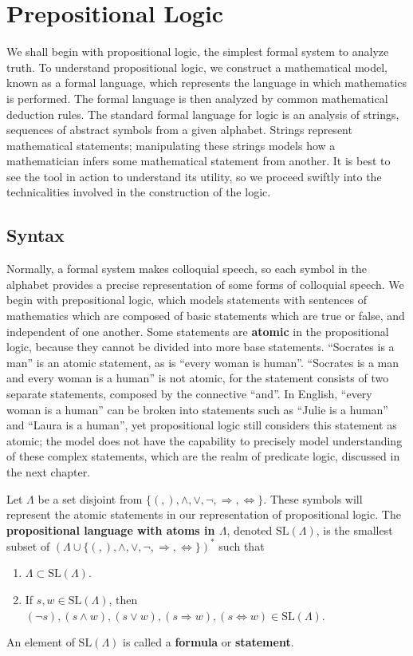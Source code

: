 \chapter{Prepositional Logic}

We shall begin with propositional logic, the simplest formal system to analyze truth. To understand propositional logic, we construct a mathematical model, known as a formal language, which represents the language in which mathematics is performed. The formal language is then analyzed by common mathematical deduction rules. The standard formal language for logic is an analysis of strings, sequences of abstract symbols from a given alphabet. Strings represent mathematical statements; manipulating these strings models how a mathematician infers some mathematical statement from another. It is best to see the tool in action to understand its utility, so we proceed swiftly into the technicalities involved in the construction of the logic.

\section{Syntax}

Normally, a formal system makes colloquial speech, so each symbol in the alphabet provides a precise representation of some forms of colloquial speech. We begin with prepositional logic, which models statements with sentences of mathematics which are composed of basic statements which are true or false, and independent of one another. Some statements are {\bf atomic} in the propositional logic, because they cannot be divided into more base statements. ``Socrates is a man'' is an atomic statement, as is ``every woman is human''. ``Socrates is a man and every woman is a human'' is not atomic, for the statement consists of two separate statements, composed by the connective ``and''. In English, ``every woman is a human'' can be broken into statements such as ``Julie is a human'' and ``Laura is a human'', yet propositional logic still considers this statement as atomic; the model does not have the capability to precisely model understanding of these complex statements, which are the realm of predicate logic, discussed in the next chapter.

Let $\Lambda$ be a set disjoint from $\{ (, ), \wedge, \vee, \neg, \Rightarrow, \Leftrightarrow \}$. These symbols will represent the atomic statements in our representation of propositional logic. The {\bf propositional language with atoms in $\Lambda$}, denoted $\text{SL}(\Lambda)$, is the smallest subset of $(\Lambda \cup \{ (, ), \wedge, \vee, \neg, \Rightarrow, \Leftrightarrow \})^*$ such that
%
\begin{enumerate}
    \item $\Lambda \subset \text{SL}(\Lambda)$.
    \item If $s, w \in \text{SL}(\Lambda)$, then $(\neg s), (s \wedge w), (s \vee w), (s \Rightarrow w), (s \Leftrightarrow w) \in \text{SL}(\Lambda)$.
\end{enumerate}
%
An element of $\text{SL}(\Lambda)$ is called a {\bf formula} or {\bf statement}.

